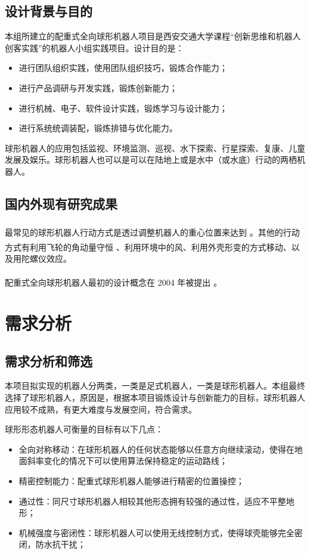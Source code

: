 \documentclass[a4paper]{ctexart}
\newcommand{ \upcite}[1]{\textsuperscript{\textsuperscript{\cite{#1} } }}
\numberwithin{equation}{section}
\numberwithin{table}{section}
\numberwithin{figure}{section}
\begin{document}
\subsection{设计背景与目的}

本组所建立的配重式全向球形机器人项目是西安交通大学课程“创新思维和机器人创客实践”的机器人小组实践项目。设计目的是：

\begin{itemize}
  \item 进行团队组织实践，使用团队组织技巧，锻炼合作能力；
  \item 进行产品调研与开发实践，锻炼创新能力；
  \item 进行机械、电子、软件设计实践，锻炼学习与设计能力；
  \item 进行系统统调装配，锻炼排错与优化能力。
\end{itemize}

球形机器人的应用包括监视、环境监测、巡视、水下探索、行星探索、复康、儿童发展及娱乐。球形机器人也可以是可以在陆地上或是水中（或水底）行动的两栖机器人。

\subsection{国内外现有研究成果}

最常见的球形机器人行动方式是透过调整机器人的重心位置来达到\upcite{halme1996motion}。其他的行动方式有利用飞轮的角动量守恒\upcite{joshi2010design}、利用环境中的风、利用外壳形变的方式移动、以及用陀螺仪效应。

配重式全向球形机器人最初的设计概念在 2004 年被提出\upcite{2004Introducing}。

\section{需求分析}

\subsection{需求分析和筛选}

本项目拟实现的机器人分两类，一类是足式机器人，一类是球形机器人。本组最终选择了球形机器人，原因是，根据本项目锻炼设计与创新能力的目标，球形机器人应用较不成熟，有更大难度与发展空间，符合需求。

球形形态机器人可衡量的目标有以下几点：

\begin{itemize}
  \item 全向对称移动：在球形机器人的任何状态能够以任意方向继续滚动，使得在地面斜率变化的情况下可以使用算法保持稳定的运动路线；
  \item 精密控制能力：配重式球形机器人能够进行精密的位置操控；
  \item 通过性：同尺寸球形机器人相较其他形态拥有较强的通过性，适应不平整地形；
  \item 机械强度与密闭性：球形机器人可以使用无线控制方式，使得球壳能够完全密闭，防水抗干扰；
\end{itemize}
\end{document}
